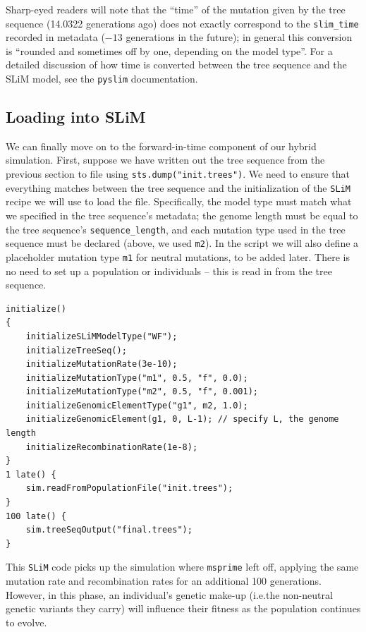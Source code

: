 \documentclass[12pt]{article}
\newcommand{\msprime}[0]{\texttt{msprime}\xspace}
\newcommand{\slim}[0]{\texttt{SLiM}\xspace}
\newcommand{\pyslim}[0]{\texttt{pyslim}\xspace}
\newcommand*{\ie}{i.e.\xcomma}
\begin{document}
Sharp-eyed readers will note that the ``time'' of the mutation given by the tree sequence (14.0322 generations ago) does not exactly
correspond to the \verb|slim_time| recorded in metadata ($-13$ generations in the future); in general this conversion is ``rounded and sometimes
off by one, depending on the model type''. For a detailed discussion of how time is converted between the tree sequence and the SLiM
model, see the \pyslim documentation.

\subsection*{Loading into SLiM}

We can finally move on to the forward-in-time component of our hybrid simulation.
First, suppose we have written out the tree sequence from the previous section to file
using \verb|sts.dump("init.trees")|.
We need to ensure that everything matches
between the tree sequence and the initialization of the \slim recipe we will use to load the file.
Specifically, the model type must match what we specified in the tree sequence's metadata;
the genome length must be equal to the tree sequence's \verb|sequence_length|,
and each mutation type used in the tree sequence must be declared (above, we used \verb|m2|).
In the script we will also define a placeholder mutation type \verb|m1| for neutral mutations, to be added later.
There is no need to set up a population or individuals -- this is read in from the tree sequence.
\begin{verbatim}
initialize()
{
    initializeSLiMModelType("WF");
    initializeTreeSeq();
    initializeMutationRate(3e-10);
    initializeMutationType("m1", 0.5, "f", 0.0);
    initializeMutationType("m2", 0.5, "f", 0.001);
    initializeGenomicElementType("g1", m2, 1.0);
    initializeGenomicElement(g1, 0, L-1); // specify L, the genome length
    initializeRecombinationRate(1e-8);
}
1 late() { 
    sim.readFromPopulationFile("init.trees");
}
100 late() {
    sim.treeSeqOutput("final.trees");
}
\end{verbatim}
This \slim code picks up the simulation where \msprime left off, applying the same mutation rate and recombination rates
for an additional 100 generations.
However, in this phase, an individual's genetic make-up (\ie the non-neutral genetic variants they carry)
will influence their fitness as the population continues to evolve.
\end{document}
